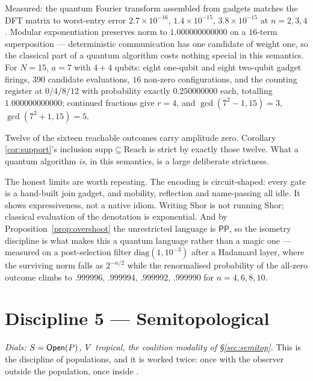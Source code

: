 Measured: the quantum Fourier transform assembled from gadgets matches the DFT
matrix to worst-entry error $2.7\times10^{-16}$, $1.4\times10^{-15}$,
$3.8\times10^{-15}$ at $n = 2,3,4$. Modular exponentiation preserves norm to
$1.000000000000$ on a $16$-term superposition --- deterministic communication has
one candidate of weight one, so the classical part of a quantum algorithm costs
nothing special in this semantics. For $N=15$, $a=7$ with $4+4$ qubits: eight
one-qubit and eight two-qubit gadget firings, $390$ candidate evaluations, $16$
non-zero configurations, and the counting register at $0/4/8/12$ with probability
exactly $0.250000000$ each, totalling $1.000000000000$; continued fractions give
$r=4$, and $\gcd(7^{2}-1,15) = 3$, $\gcd(7^{2}+1,15) = 5$.

\begin{observation}
\label{obs:shordeficit}
Twelve of the sixteen reachable outcomes carry amplitude zero. Corollary
\ref{cor:support}'s inclusion $\mathrm{supp} \subseteq \mathrm{Reach}$ is strict by
exactly those twelve. What a quantum algorithm \emph{is}, in this semantics, is a
large deliberate strictness.
\end{observation}

The honest limits are worth repeating. The encoding is circuit-shaped: every gate
is a hand-built join gadget, and mobility, reflection and name-passing all idle.
It shows expressiveness, not a native idiom. Writing Shor is not running Shor;
classical evaluation of the denotation is exponential. And by
Proposition~\ref{prop:overshoot} the unrestricted language is $\mathsf{PP}$, so the
isometry discipline is what makes this a quantum language rather than a magic one
--- measured on a post-selection filter $\mathrm{diag}(1, 10^{-3})$ after a
Hadamard layer, where the surviving norm falls as $2^{-n/2}$ while the
renormalised probability of the all-zero outcome climbs to
$.999996$, $.999994$, $.999992$, $.999990$ for $n = 4,6,8,10$.

\section{Discipline 5 --- Semitopological}
\label{sec:d5}

\emph{Dials: $S = \mathsf{Open}(P)$, $V$ tropical, the coalition modality of
\S\ref{sec:semitop}.} This is the discipline of populations, and it is worked
twice: once with the observer outside the population, once inside
\cite{QuorumNote}.

